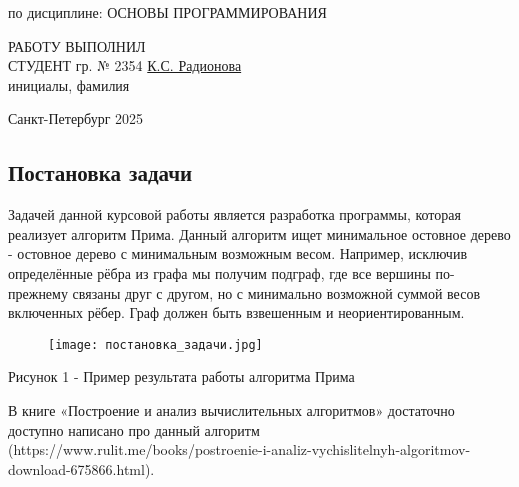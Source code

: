 \documentclass[a4paper,16pt]{article}
\begin{document}
\begin{center}
    по дисциплине:
    ОСНОВЫ ПРОГРАММИРОВАНИЯ
\end{center}

\vspace{4cm}

\begin{flushleft} 
    РАБОТУ ВЫПОЛНИЛ \\
    СТУДЕНТ гр. № 2354 
    \qquad \qquad \qquad \qquad \qquad \qquad \qquad \qquad \qquad \qquad \qquad \qquad \qquad\qquad 
    \underline{К.С. Радионова} \\
    \qquad \qquad \qquad \qquad\qquad \qquad \qquad \qquad\qquad \qquad {}
    \qquad \qquad \qquad \qquad \qquad инициалы, фамилия
\end{flushleft}

\vspace{3cm}

\begin{center}
    Санкт-Петербург 2025
\end{center}

\vspace{2cm}

 \thispagestyle{empty}

\tableofcontents %
\newpage 

\begin{center}
   \section{Постановка задачи} 
\end{center}
Задачей данной курсовой работы является разработка программы, которая реализует алгоритм Прима. Данный алгоритм ищет минимальное остовное дерево - остовное дерево с минимальным возможным весом. Например, исключив определённые рёбра из графа мы получим подграф, где все вершины по-прежнему связаны друг с другом, но с минимально возможной суммой весов включенных рёбер. Граф должен быть взвешенным и неориентированным.

\begin{figure}[h]
    \centering
    \texttt{[image: постановка\_задачи.jpg]}
\end{figure}
\hypertarget{2}{}
\begin{center}
    Рисунок 1 - Пример результата работы алгоритма Прима
\end{center}

В книге «Построение и анализ вычислительных алгоритмов» достаточно доступно написано про данный алгоритм (https://www.rulit.me/books/postroenie-i-analiz-vychislitelnyh-algoritmov-download-675866.html).
\end{document}
